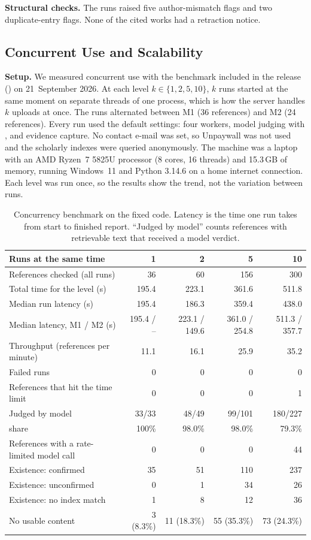 \documentclass{article}
\newcommand{\vd}[1]{\texttt{\detokenize{#1}}}
\begin{document}
\textbf{Structural checks.} The runs raised five author-mismatch flags and two duplicate-entry flags. None of the cited works had a retraction notice.

\subsection{Concurrent Use and Scalability}
\label{sec:concurrency}

\textbf{Setup.} We measured concurrent use with the benchmark included in the release (\vd{tools/benchmark.py}) on 21~September 2026. At each level $k \in \{1, 2, 5, 10\}$, $k$ runs started at the same moment on separate threads of one process, which is how the server handles $k$ uploads at once. The runs alternated between M1 (36 references) and M2 (24 references). Every run used the default settings: four workers, model judging with \vd{gpt-4.1}, and evidence capture. No contact e-mail was set, so Unpaywall was not used and the scholarly indexes were queried anonymously. The machine was a laptop with an AMD Ryzen~7 5825U processor (8 cores, 16 threads) and 15.3\,GB of memory, running Windows~11 and Python 3.14.6 on a home internet connection. Each level was run once, so the results show the trend, not the variation between runs.

\begin{table}[htbp]
\centering
\caption{Concurrency benchmark on the fixed code. Latency is the time one run takes from start to finished report. ``Judged by model'' counts references with retrievable text that received a model verdict.}
\label{tab:concurrency}
\small
\begin{tabular}{@{}l r r r r@{}}
\toprule
\textbf{Runs at the same time} & \textbf{1} & \textbf{2} & \textbf{5} & \textbf{10}\\
\midrule
References checked (all runs) & 36 & 60 & 156 & 300\\
Total time for the level (s) & 195.4 & 223.1 & 361.6 & 511.8\\
Median run latency (s) & 195.4 & 186.3 & 359.4 & 438.0\\
Median latency, M1 / M2 (s) & 195.4 / -- & 223.1 / 149.6 & 361.0 / 254.8 & 511.3 / 357.7\\
Throughput (references per minute) & 11.1 & 16.1 & 25.9 & 35.2\\
Failed runs & 0 & 0 & 0 & 0\\
References that hit the time limit & 0 & 0 & 0 & 1\\
\midrule
Judged by model & 33/33 & 48/49 & 99/101 & 180/227\\
\quad share & 100\% & 98.0\% & 98.0\% & 79.3\%\\
References with a rate-limited model call & 0 & 0 & 0 & 44\\
\midrule
Existence: confirmed & 35 & 51 & 110 & 237\\
Existence: unconfirmed & 0 & 1 & 34 & 26\\
Existence: no index match & 1 & 8 & 12 & 36\\
No usable content & 3 (8.3\%) & 11 (18.3\%) & 55 (35.3\%) & 73 (24.3\%)\\
\bottomrule
\end{tabular}
\end{table}
\end{document}
